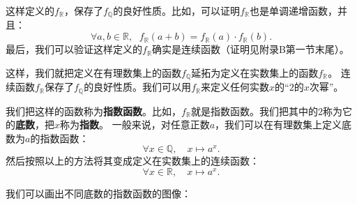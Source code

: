 \documentclass[12pt,UTF8]{ctexbook}
\begin{document}
这样定义的$f_{\mathbb{R}}$，保存了$f_{\mathbb{Q}}$的良好性质。比如，可以证明$f_{\mathbb{R}}$也是单调递增函数，并且：
$$ \forall a, b \in \mathbb{R}, \;\,\, f_{\mathbb{R}}(a + b) = f_{\mathbb{R}}(a) \cdot f_{\mathbb{R}}(b).$$
最后，我们可以验证这样定义的$f_{\mathbb{R}}$确实是连续函数（证明见附录B第一节末尾）。

这样，我们就把定义在有理数集上的函数$f_{\mathbb{Q}}$延拓为定义在实数集上的函数$f_{\mathbb{R}}$。
连续函数$f_{\mathbb{R}}$保存了$f_{\mathbb{Q}}$的良好性质。我们可以用$f_{\mathbb{R}}$来定义任何实数$x$的“$2$的$x$次幂”。

我们把这样的函数称为\textbf{指数函数}。比如，$f_{\mathbb{R}}$就是指数函数。我们把其中的$2$称为它的\textbf{底数}，把$x$称为\textbf{指数}。
一般来说，对任意正数$a$，我们可以在有理数集上定义底数为$a$的指数函数：
$$ \forall x\in\mathbb{Q}, \quad x\mapsto a^x.$$
然后按照以上的方法将其变成定义在实数集上的连续函数：
$$ \forall x\in\mathbb{R}, \quad x\mapsto a^x.$$

我们可以画出不同底数的指数函数的图像：
\end{document}
